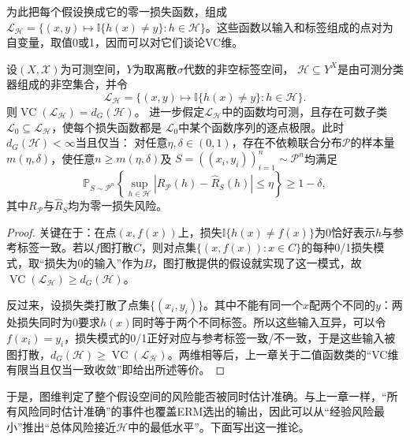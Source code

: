 为此把每个假设换成它的零一损失函数，组成$\mathcal L_{\mathcal H}=\{(x,y)\mapsto\mathbb I\{h(x)\neq y\}:h\in\mathcal H\}$。这些函数以输入和标签组成的点对为自变量，取值0或1，因而可以对它们谈论VC维。

\begin{theorem}[图维与一致收敛]
\label{thm:graph-uniform-convergence}
设$(X,\mathcal X)$为可测空间，$Y$为取离散$\sigma$代数的非空标签空间，
$\mathcal H\subseteq Y^X$是由可测分类器组成的非空集合，并令
\[
 \mathcal L_{\mathcal H}
 =\{(x,y)\mapsto\mathbb I\{h(x)\neq y\}:h\in\mathcal H\}.
\]
则$\operatorname{VC}(\mathcal L_{\mathcal H})=d_G(\mathcal H)$。
进一步假定$\mathcal L_{\mathcal H}$中的函数均可测，且存在可数子类
$\mathcal L_0\subseteq\mathcal L_{\mathcal H}$，使每个损失函数都是
$\mathcal L_0$中某个函数序列的逐点极限。此时$d_G(\mathcal H)<\infty$当且仅当：
对任意$\eta,\delta\in(0,1)$，存在不依赖联合分布$\mathcal P$的样本量
$m(\eta,\delta)$，使任意$n\geq m(\eta,\delta)$及
$S=((x_i,y_i))_{i=1}^n\sim\mathcal P^n$均满足
\[
 \mathbb P_{S\sim\mathcal P^n}\left\{
 \sup_{h\in\mathcal H}|R_{\mathcal P}(h)-\hat R_S(h)|\leq\eta
 \right\}\geq1-\delta,
\]
其中$R_{\mathcal P}$与$\hat R_S$均为零一损失风险。
\end{theorem}

\begin{proof}
关键在于：在点$(x,f(x))$上，损失$\mathbb I\{h(x)\neq f(x)\}$为0恰好表示$h$与参考标签一致。若以$f$图打散$C$，则对点集$\{(x,f(x)):x\in C\}$的每种0/1损失模式，取“损失为0的输入”作为$B$，图打散提供的假设就实现了这一模式，故$\operatorname{VC}(\mathcal L_{\mathcal H})\geq d_G(\mathcal H)$。

反过来，设损失类打散了点集$\{(x_i,y_i)\}$。其中不能有同一个$x$配两个不同的$y$：两处损失同时为0要求$h(x)$同时等于两个不同标签。所以这些输入互异，可以令$f(x_i)=y_i$，损失模式的0/1正好对应与参考标签一致/不一致，于是这些输入被图打散，$d_G(\mathcal H)\geq\operatorname{VC}(\mathcal L_{\mathcal H})$。两维相等后，上一章关于二值函数类的“VC维有限当且仅当一致收敛”即给出所述等价。
\end{proof}

于是，图维判定了整个假设空间的风险能否被同时估计准确。与上一章一样，“所有风险同时估计准确”的事件也覆盖ERM选出的输出，因此可以从“经验风险最小”推出“总体风险接近$\mathcal H$中的最低水平”。下面写出这一推论。

